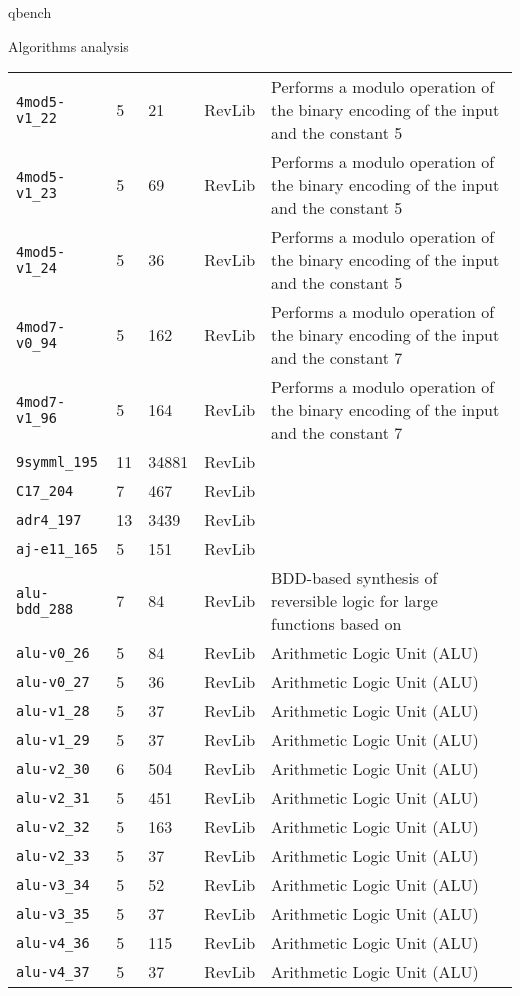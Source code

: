 \documentclass[11pt]{beamer}
\begin{document}
\begin{frame}[fragile,label={sec:org639c711}]{qbench}
\begin{block}{Algorithms analysis}
\begin{table}[htbp]
\begin{tabular}{|p{3cm}|p{1.5cm}|p{1cm}|p{1cm}|p{7.5cm}|}
\texttt{4mod5-v1\_22} & 5 & 21 & RevLib & Performs a modulo operation of the binary encoding of the input and the constant 5\\
\texttt{4mod5-v1\_23} & 5 & 69 & RevLib & Performs a modulo operation of the binary encoding of the input and the constant 5\\
\texttt{4mod5-v1\_24} & 5 & 36 & RevLib & Performs a modulo operation of the binary encoding of the input and the constant 5\\
\texttt{4mod7-v0\_94} & 5 & 162 & RevLib & Performs a modulo operation of the binary encoding of the input and the constant 7\\
\texttt{4mod7-v1\_96} & 5 & 164 & RevLib & Performs a modulo operation of the binary encoding of the input and the constant 7\\
\texttt{9symml\_195} & 11 & 34881 & RevLib & \\
\texttt{C17\_204} & 7 & 467 & RevLib & \\
\texttt{adr4\_197} & 13 & 3439 & RevLib & \\
\texttt{aj-e11\_165} & 5 & 151 & RevLib & \\
\texttt{alu-bdd\_288} & 7 & 84 & RevLib & BDD-based synthesis of reversible logic for large functions based on \cite{Wille_2009}\\
\texttt{alu-v0\_26} & 5 & 84 & RevLib & Arithmetic Logic Unit (ALU)\\
\texttt{alu-v0\_27} & 5 & 36 & RevLib & Arithmetic Logic Unit (ALU)\\
\texttt{alu-v1\_28} & 5 & 37 & RevLib & Arithmetic Logic Unit (ALU)\\
\texttt{alu-v1\_29} & 5 & 37 & RevLib & Arithmetic Logic Unit (ALU)\\
\texttt{alu-v2\_30} & 6 & 504 & RevLib & Arithmetic Logic Unit (ALU)\\
\texttt{alu-v2\_31} & 5 & 451 & RevLib & Arithmetic Logic Unit (ALU)\\
\texttt{alu-v2\_32} & 5 & 163 & RevLib & Arithmetic Logic Unit (ALU)\\
\texttt{alu-v2\_33} & 5 & 37 & RevLib & Arithmetic Logic Unit (ALU)\\
\texttt{alu-v3\_34} & 5 & 52 & RevLib & Arithmetic Logic Unit (ALU)\\
\texttt{alu-v3\_35} & 5 & 37 & RevLib & Arithmetic Logic Unit (ALU)\\
\texttt{alu-v4\_36} & 5 & 115 & RevLib & Arithmetic Logic Unit (ALU)\\
\texttt{alu-v4\_37} & 5 & 37 & RevLib & Arithmetic Logic Unit (ALU)\\

\end{tabular}
\end{table}
\end{block}
\end{frame}
\end{document}
